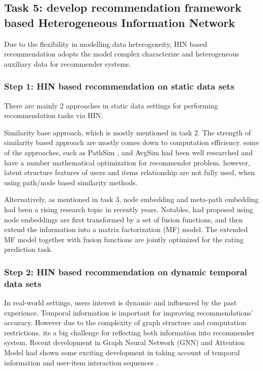 \documentclass[12pt,a4 paper,title page]{article}
\theoremstyle{definition}
\begin{document}
\subsection{Task 5: develop recommendation framework based Heterogeneous Information Network}

Due to the flexibility in modelling data heterogeneity, HIN based recommendation adopts the model complex characterize and heterogeneous auxiliary data for recommender systems.

\subsubsection*{Step 1: HIN based recommendation on static data sets}
There are mainly 2 approaches in static data settings for performing recommendation tasks via HIN. 

Similarity base approach, which is mostly mentioned in task 2. The strength of similarity based approach are mostly comes down to computation efficiency. some of the approaches, such as PathSim \citep{Sun2011PathSim}, and AvgSim \citep{xiao2016avgsim} had been well researched and have a number mathematical optimization for recommender problem. however, latent structure features of users and items relationship are not fully used, when using path/node based similarity methods.

Alternatively, as mentioned in task 3, node embedding and meta-path embedding had been a rising research topic in recently years. Notables, \citet{shi2018heterogeneous} had proposed using node embeddings are first transformed by a set of fusion functions, and then extend the information into a matrix factorization (MF) model. The extended MF model together with fusion functions are jointly optimized for the rating prediction task.

\subsubsection*{Step 2: HIN based recommendation on dynamic temporal data sets}

In real-world settings, users interest is dynamic and influenced by the past experience. Temporal information is important for improving recommendations' accuracy. However due to the complexity of graph structure and computation restrictions. its a big challenge for reflecting both information into recommender system. Recent development in Graph Neural Network (GNN) and Attention Model had shown some exciting development in taking account of temporal information and user-item interaction sequences \citep{yu2017spatio}.  
\end{document}
